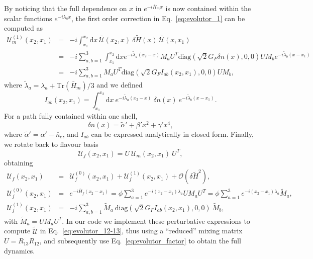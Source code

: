 \documentclass{article}
\newcommand{\de}[0]{\text{d}}
\begin{document}
By noticing that the full dependence on $x$ in $e^{-i \bar{H}_m x}$ is now contained within the scalar functions $e^{- i \lambda_a x}$, the first order correction in Eq.~\ref{eq:evolutor_1} can be computed as
\begin{eqnarray}
\mathcal{U}^{(1)}_m(x_2,x_1) &=&	- i \int_{x_1}^{x_2} \de x\ \bar{\mathcal{U}}(x_2,x)\ \delta \tilde{H}(x)\ \bar{\mathcal{U}}(x,x_1) \\
&=& - i \sum_{a,b=1}^3 \int_{x_1}^{x_2} \de x e^{- i \tilde{\lambda}_a (x_2-x)} M_a U^T \text{diag}\left(\sqrt{2} G_F \delta n(x),0,0\right) U M_b e^{- i \tilde{\lambda}_b (x-x_1)}\\
&=& - i \sum_{a,b=1}^3 M_a U^T \text{diag}\left(\sqrt{2}G_F I_{ab}(x_2, x_1), 0, 0\right) U M_b,
\end{eqnarray}
where  $\tilde{\lambda}_a = \lambda_a + \text{Tr}(\bar{H}_m)/3$ and we defined
\begin{equation}
	I_{ab}(x_2,x_1) = \int_{x_1}^{x_2}\de x\ e^{- i \tilde{\lambda}_a (x_2-x)}\ \delta n(x)\ e^{- i \tilde{\lambda}_b (x-x_1)}.
\end{equation}
For a path fully contained within one shell, 
\begin{equation}
	\delta n (x) = \tilde{\alpha}' + \beta' x^2 + \gamma' x^4,
\end{equation}
where $\tilde{\alpha}' = \alpha' - \bar{n}_e$, and $I_{ab}$ can be expressed analytically in closed form.
Finally, we rotate back to flavour basis
\begin{equation}
	\mathcal{U}_f(x_2,x_1) = U\ \mathcal{U}_m(x_2,x_1)\ U^T,
\end{equation}
obtaining
\begin{eqnarray}
\mathcal{U}_f(x_2,x_1) &=& \mathcal{U}^{(0)}_f(x_2,x_1) +\mathcal{U}^{(1)}_f(x_2,x_1) + \mathcal{O}(\delta \tilde{H}^2),\\
\mathcal{U}^{(0)}_f(x_2,x_1) &=& 	e^{- i \bar{H}_f (x_2-x_1)} = \phi \sum_{a=1}^3 e^{-i (x_2-x_1) \lambda_a} U M_a U^T = \phi \sum_{a=1}^3 e^{-i (x_2-x_1) \lambda_a} \tilde{M}_a,\\
\mathcal{U}^{(1)}_f(x_2,x_1) &=& - i \sum_{a,b=1}^3 \tilde{M}_a\ \text{diag}\left(\sqrt{2}G_F I_{ab}(x_2, x_1), 0, 0\right)\ \tilde{M}_b,
\end{eqnarray}
with $\tilde{M}_a = U M_a U^T$. In our code we implement these perturbative expressions to compute $\tilde{\mathcal{U}}$ in Eq.~\ref{eq:evolutor_12-13}, thus using a ``reduced'' mixing matrix $U = R_{13} R_{12}$, and subsequently use Eq.~\ref{eq:evolutor_factor} to obtain the full dynamics.
\end{document}
